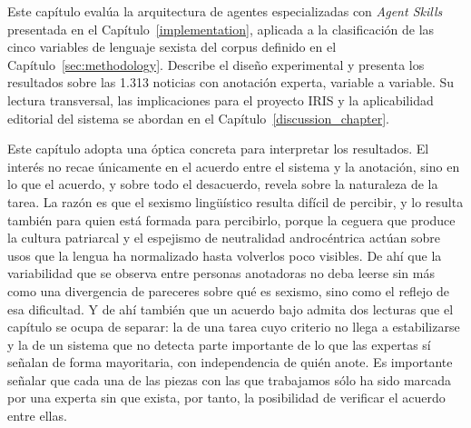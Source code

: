 
Este capítulo evalúa la arquitectura de agentes especializadas con \textit{Agent
Skills} presentada en el Capítulo~\ref{implementation}, aplicada a la
clasificación de las cinco variables de lenguaje sexista del corpus definido en el
Capítulo~\ref{sec:methodology}. Describe el diseño experimental y presenta los
resultados sobre las 1.313 noticias con anotación experta, variable a variable. Su
lectura transversal, las implicaciones para el proyecto IRIS y la aplicabilidad
editorial del sistema se abordan en el Capítulo~\ref{discussion_chapter}.

Este capítulo adopta una óptica concreta para interpretar los resultados. El interés
no recae únicamente en el acuerdo entre el sistema y la anotación, sino en lo que el
acuerdo, y sobre todo el desacuerdo, revela sobre la naturaleza de la tarea. La razón
es que el sexismo lingüístico resulta difícil de percibir, y lo resulta también para
quien está formada para percibirlo, porque la ceguera que produce la cultura patriarcal y el espejismo de
neutralidad androcéntrica actúan sobre usos que la lengua ha normalizado hasta
volverlos poco visibles. De ahí que la variabilidad que se observa entre personas
anotadoras no deba leerse sin más como una divergencia de pareceres sobre qué es
sexismo, sino como el reflejo de esa dificultad. Y de ahí también que un acuerdo bajo
admita dos lecturas que el capítulo se ocupa de separar: la de una tarea cuyo criterio
no llega a estabilizarse y la de un sistema que no detecta parte importante de lo que las expertas sí
señalan de forma mayoritaria, con independencia de quién anote. Es importante señalar que cada una de las piezas con las que trabajamos sólo ha sido marcada por una experta sin que exista, por tanto, la posibilidad de verificar el acuerdo entre ellas. 
